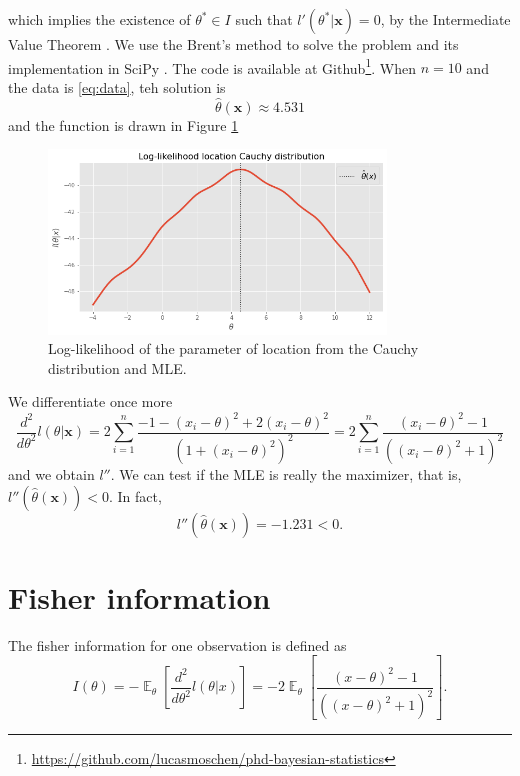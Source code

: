 \documentclass[a4paper,10pt, notitlepage]{report}
\theoremstyle{plain}
\newcommand{\ev}{\operatorname{\mathbb{E}}}
\newcommand{\bx}{\boldsymbol{x}} %
\begin{document}
    which implies the existence of $\theta^* \in I$ such that $l'(\theta^*|\bx)
    = 0$, by the Intermediate Value Theorem \cite[Theorem 12, Page 184]{Lages1976}. We use the Brent’s method \cite[]{brent} to solve the problem and its
    implementation in SciPy \cite[]{2020SciPy-NMeth}. The code is available at
    Github\footnote{\url{https://github.com/lucasmoschen/phd-bayesian-statistics}}\cite[]{github}. When $n=10$ and the data is \ref{eq:data}, teh solution is
    $$
    \hat{\theta}(\bx) \approx 4.531
    $$
    and the function is drawn in Figure \ref{fig:log-likelihood-cauchy}
    \begin{figure}[!hb]
        \centering
        \includegraphics[width=0.8\textwidth]{../../images/log-likelihood.png}
        \caption{Log-likelihood of the parameter of location from the Cauchy distribution and MLE.}
        \label{fig:log-likelihood-cauchy}
    \end{figure}
    
    
    We differentiate once more 
    \begin{equation}
        \label{eq:dderivarive-log-cauchy}
        \frac{d^2}{d\theta^2}l(\theta|\bx) = 2\sum_{i=1}^{n} \frac{- 1 - (x_i - \theta)^2 + 2(x_i-\theta)^2}{(1 + (x_i - \theta)^2)^2} = 2\sum_{i=1}^{n} \frac{(x_i - \theta)^2-1}{( (x_i - \theta)^2+1)^2}
    \end{equation}
    and we obtain $l''$. We can test if the MLE is really the maximizer, that is,
    $l''\left(\hat{\theta}(\bx)\right) < 0$. In fact,
    $$
    l''\left(\hat{\theta}(\bx)\right) = -1.231 < 0.
    $$

\section*{Fisher information}

The fisher information for one observation is defined as
\begin{equation}
    \label{eq:fisher-info}
    I(\theta) = -\ev_{\theta}\left[\frac{d^2}{d\theta^2}l(\theta|x)\right] = -2\ev_{\theta}\left[\frac{(x - \theta)^2 - 1}{((x - \theta)^2 + 1)^2}\right].
\end{equation}
\end{document}
